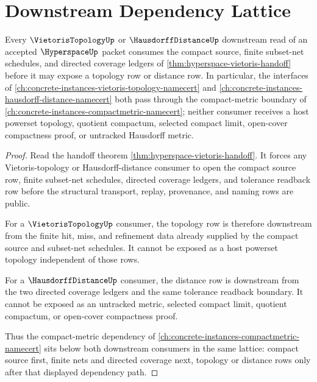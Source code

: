 \section{Downstream Dependency Lattice}
\label{sec:hyperspace-downstream-dependency-lattice}

\begin{theorem}
\label{thm:hyperspace-vietoris-downstream-dependency}
Every $\VietorisTopologyUp$ or $\HausdorffDistanceUp$ downstream read of an accepted $\HyperspaceUp$ packet consumes the compact source, finite subset-net schedules, and directed coverage ledgers of \autoref{thm:hyperspace-vietoris-handoff} before it may expose a topology row or distance row. In particular, the interfaces of \autoref{ch:concrete-instances-vietoris-topology-namecert} and \autoref{ch:concrete-instances-hausdorff-distance-namecert} both pass through the compact-metric boundary of \autoref{ch:concrete-instances-compactmetric-namecert}; neither consumer receives a host powerset topology, quotient compactum, selected compact limit, open-cover compactness proof, or untracked Hausdorff metric.
\end{theorem}
\begin{proof}
Read the handoff theorem \autoref{thm:hyperspace-vietoris-handoff}. It forces any Vietoris-topology or Hausdorff-distance consumer to open the compact source row, finite subset-net schedules, directed coverage ledgers, and tolerance readback row before the structural transport, replay, provenance, and naming rows are public.

For a $\VietorisTopologyUp$ consumer, the topology row is therefore downstream from the finite hit, miss, and refinement data already supplied by the compact source and subset-net schedules. It cannot be exposed as a host powerset topology independent of those rows.

For a $\HausdorffDistanceUp$ consumer, the distance row is downstream from the two directed coverage ledgers and the same tolerance readback boundary. It cannot be exposed as an untracked metric, selected compact limit, quotient compactum, or open-cover compactness proof.

Thus the compact-metric dependency of \autoref{ch:concrete-instances-compactmetric-namecert} sits below both downstream consumers in the same lattice: compact source first, finite nets and directed coverage next, topology or distance rows only after that displayed dependency path.
\end{proof}
